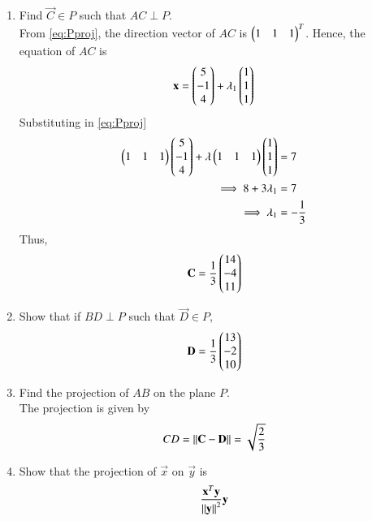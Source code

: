 \begin{enumerate}[label=\arabic*.,ref=\thesubsection.\theenumi]
\begin{figure}[!ht]
\caption{}
\label{fig:3.2}
\end{figure}
\item Find $\vec{C} \in P$  such that $AC \perp P$.  
\\
\solution From \eqref{eq:Pproj}, the direction vector of $AC$ is $\begin{pmatrix}1 & 1 & 1\end{pmatrix}^T$.  Hence, the equation of 
$AC$ is
\begin{equation}
\mathbf{x} = \begin{pmatrix}5 \\ -1 \\ 4\end{pmatrix} + \lambda_1  \begin{pmatrix}1 \\ 1 \\ 1\end{pmatrix}
\end{equation}
Substituting in \eqref{eq:Pproj}
\begin{align}
 \begin{pmatrix}1 & 1 & 1\end{pmatrix}\begin{pmatrix}5 \\ -1 \\ 4\end{pmatrix} + \lambda \begin{pmatrix}1 & 1 & 1\end{pmatrix}
\begin{pmatrix}1 \\ 1 \\ 1\end{pmatrix} &= 7
\\
\implies 8 + 3\lambda_1 &= 7
\\
\implies \lambda_1 &= -\frac{1}{3}
\end{align}
Thus,
\begin{align}
\mathbf{C} = \frac{1}{3}\begin{pmatrix}14 \\ -4 \\ 11\end{pmatrix}
\end{align}
\item Show that if $BD \perp P$  such that $\vec{D} \in P$,
\begin{equation}
\mathbf{D} = \frac{1}{3}\begin{pmatrix}13 \\ -2 \\ 10\end{pmatrix}
\end{equation}
%
\item Find the projection of $AB$ on the plane $P$.
\\
\solution The projection is given by
\begin{align}
CD = \left\lVert\mathbf{C}-\mathbf{D}\right\rVert = \sqrt{\frac{2}{3}}
\end{align}
\item Show that the projection of $\vec{x}$ on $\vec{y}$ is
\begin{align}
\label{eq:2019_qp2_14_proj}
\frac{\mathbf{x}^T\mathbf{y}}{\left\lVert\mathbf{y}\right\rVert^2}\mathbf{y}
\end{align}
\end{enumerate}

